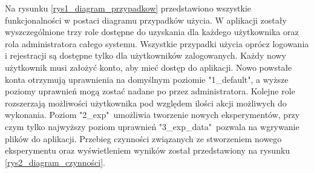 Na rysunku \ref{rys1_diagram_przypadkow} przedstawiono wszystkie funkcjonalności w postaci diagramu przypadków użycia. W aplikacji zostały wyszczególnione trzy role dostępne do uzyskania dla każdego użytkownika oraz rola administratora całego systemu. Wszystkie przypadki użycia oprócz logowania i rejestracji są dostępne tylko dla użytkowników zalogowanych. Każdy nowy użytkownik musi założyć konto, aby mieć dostęp do aplikacji. Nowo powstałe konta otrzymują uprawnienia na domyślnym poziomie "1\_default", a wyższe poziomy uprawnień mogą zostać nadane po przez administratora. Kolejne role rozszerzają możliwości użytkownika pod względem ilości akcji możliwych do wykonania. Poziom "2\_exp"\ umożliwia tworzenie nowych eksperymentów, przy czym tylko najwyższy poziom uprawnień "3\_exp\_data"\  pozwala na wgrywanie plików do aplikacji. Przebieg czynności związanych ze stworzeniem nowego eksperymentu oraz wyświetleniem wyników został przedstawiony na rysunku \ref{rys2_diagram_czynności}. 



